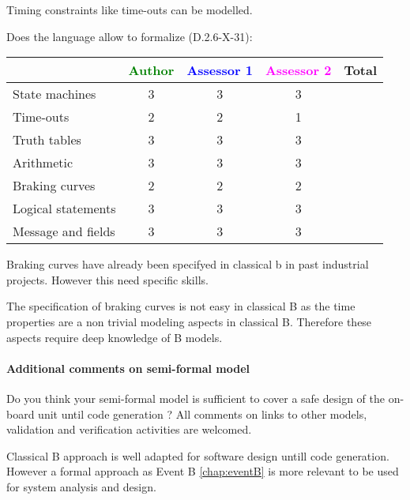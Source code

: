 \begin{author_comment}
Timing constraints like time-outs can be modelled.
\end{author_comment}


Does the language allow to  formalize (D.2.6-X-31):

\begin{tabular}{|l | c | c | c | c|}
\hline
& \textcolor{green}{Author} & \textcolor{blue}{Assessor 1} & \textcolor{magenta}{Assessor 2} & Total \\
\hline 
State machines  & 3 & 3 & 3 &  \\
\hline
Time-outs  & 2 & 2 & 1 &  \\
\hline
Truth tables  & 3 & 3 & 3 &  \\
\hline
Arithmetic  & 3 & 3 & 3 &  \\
\hline
Braking curves  & 2 & 2 & 2 &  \\
\hline
Logical statements & 3 & 3 & 3 &  \\
\hline
Message and fields & 3 & 3 & 3 &  \\
\hline
\end{tabular}


\begin{author_comment}
Braking curves have already been specifyed in classical b  in past industrial projects. However this need specific skills.
\end{author_comment}


\begin{assessor2}
The specification of braking curves is not easy in classical B as the time properties are a non trivial modeling aspects in classical B. Therefore these aspects require deep knowledge of B models.
\end{assessor2}

\paragraph{Additional comments on semi-formal  model} Do you think your semi-formal  model is sufficient to cover a safe design of the on-board unit until code generation ?
All comments on links to  other models, validation and verification activities are welcomed.



\begin{author_comment}
Classical B  approach is well adapted for software design untill code generation. However a formal approach as Event B \ref{chap:eventB} is more relevant to be used for system analysis and design.
\end{author_comment}



